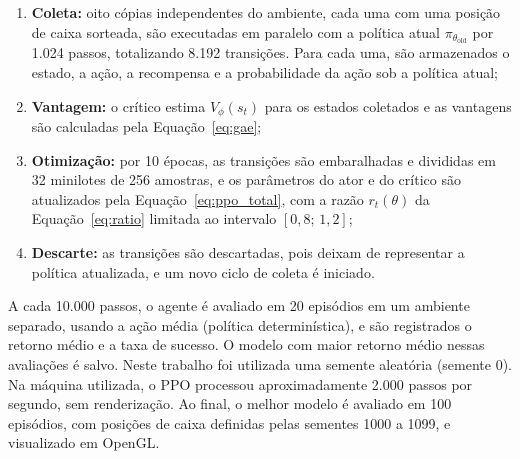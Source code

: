 \begin{enumerate}
    \item \textbf{Coleta:} oito cópias independentes do ambiente, cada uma com uma posição de caixa sorteada, são executadas em paralelo com a política atual $\pi_{\theta_{\text{old}}}$ por 1.024 passos, totalizando 8.192 transições. Para cada uma, são armazenados o estado, a ação, a recompensa e a probabilidade da ação sob a política atual;
    \item \textbf{Vantagem:} o crítico estima $V_\phi(s_t)$ para os estados coletados e as vantagens são calculadas pela Equação~\ref{eq:gae};
    \item \textbf{Otimização:} por 10 épocas, as transições são embaralhadas e divididas em 32 minilotes de 256 amostras, e os parâmetros do ator e do crítico são atualizados pela Equação~\ref{eq:ppo_total}, com a razão $r_t(\theta)$ da Equação~\ref{eq:ratio} limitada ao intervalo $[0{,}8;\,1{,}2]$;
    \item \textbf{Descarte:} as transições são descartadas, pois deixam de representar a política atualizada, e um novo ciclo de coleta é iniciado.
\end{enumerate}

A cada 10.000 passos, o agente é avaliado em 20 episódios em um ambiente separado, usando a ação média (política determinística), e são registrados o retorno médio e a taxa de sucesso. O modelo com maior retorno médio nessas avaliações é salvo. Neste trabalho foi utilizada uma semente aleatória (semente 0). Na máquina utilizada, o PPO processou aproximadamente 2.000 passos por segundo, sem renderização. Ao final, o melhor modelo é avaliado em 100 episódios, com posições de caixa definidas pelas sementes 1000 a 1099, e visualizado em OpenGL.
